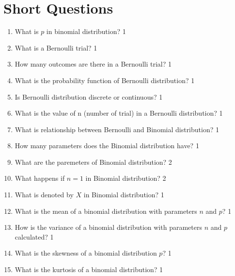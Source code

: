 \documentclass[a4paper,oneside, margin=1.4in]{book}
\begin{document}
\section{Short Questions}

 \begin{enumerate}
 
 \item What is $p$ in binomial distribution? \hfill 1
 
 \item What is a Bernoulli trial?  \hfill 1
 
 \item How many outcomes are there in a Bernoulli trial?  \hfill 1
 
 \item What is the probability function of Bernoulli distribution? \hfill 1
 
 \item Is Bernoulli distribution discrete or continuous? \hfill 1
 
 \item What is the value of n (number of trial) in a Bernoulli distribution? \hfill 1
 
 \item What is relationship between Bernoulli and Binomial distribution? \hfill 1
 
 \item How many parameters does the Binomial distribution have? \hfill 1
  
  \item What are the paremeters of Binomial distribution? \hfill 2
  
  \item What happens if $n=1$ in Binomial distribution? \hfill 2
  
  \item What is denoted by $X$ in Binomial distribution? \hfill 1
  
 \item What is the mean of a binomial distribution with parameters \( n \) and \( p \)? \hfill 1

\item How is the variance of a binomial distribution with parameters \( n \) and \( p \) calculated? \hfill 1

\item What is the skewness of a binomial distribution \( p \)? \hfill 1

\item What is the kurtosis of a binomial distribution? \hfill 1


\end{enumerate}
\end{document}
